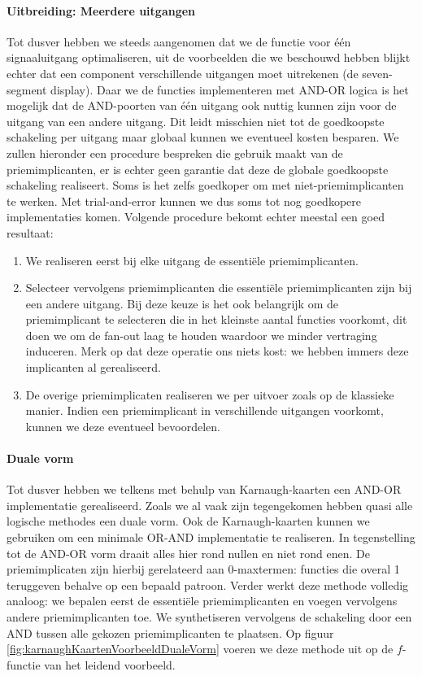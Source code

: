 \paragraph{Uitbreiding: Meerdere uitgangen}
Tot dusver hebben we steeds aangenomen dat we de functie voor \'e\'en signaaluitgang optimaliseren, uit de voorbeelden die we beschouwd hebben blijkt echter dat een component verschillende uitgangen moet uitrekenen (de seven-segment display). Daar we de functies implementeren met AND-OR logica is het mogelijk dat de AND-poorten van \'e\'en uitgang ook nuttig kunnen zijn voor de uitgang van een andere uitgang. Dit leidt misschien niet tot de goedkoopste schakeling per uitgang maar globaal kunnen we eventueel kosten besparen. We zullen hieronder een procedure bespreken die gebruik maakt van de priemimplicanten, er is echter geen garantie dat deze de globale goedkoopste schakeling realiseert. Soms is het zelfs goedkoper om met niet-priemimplicanten te werken. Met trial-and-error kunnen we dus soms tot nog goedkopere implementaties komen. Volgende procedure bekomt echter meestal een goed resultaat:
\begin{enumerate}
 \item We realiseren eerst bij elke uitgang de essenti\"ele priemimplicanten.
 \item Selecteer vervolgens priemimplicanten die essenti\"ele priemimplicanten zijn bij een andere uitgang. Bij deze keuze is het ook belangrijk om de priemimplicant te selecteren die in het kleinste aantal functies voorkomt, dit doen we om de fan-out laag te houden waardoor we minder vertraging induceren. Merk op dat deze operatie ons niets kost: we hebben immers deze implicanten al gerealiseerd.
 \item De overige priemimplicaten realiseren we per uitvoer zoals op de klassieke manier. Indien een priemimplicant in verschillende uitgangen voorkomt, kunnen we deze eventueel bevoordelen.
\end{enumerate}
\paragraph{Duale vorm}
Tot dusver hebben we telkens met behulp van Karnaugh-kaarten een AND-OR implementatie gerealiseerd. Zoals we al vaak zijn tegengekomen hebben quasi alle logische methodes een duale vorm. Ook de Karnaugh-kaarten kunnen we gebruiken om een minimale OR-AND implementatie te realiseren. In tegenstelling tot de AND-OR vorm draait alles hier rond nullen en niet rond enen. De priemimplicaten zijn hierbij gerelateerd aan 0-maxtermen: functies die overal 1 teruggeven behalve op een bepaald patroon. Verder werkt deze methode volledig analoog: we bepalen eerst de essenti\"ele priemimplicanten en voegen vervolgens andere priemimplicanten toe. We synthetiseren vervolgens de schakeling door een AND tussen alle gekozen priemimplicanten te plaatsen. Op figuur \ref{fig:karnaughKaartenVoorbeeldDualeVorm} voeren we deze methode uit op de $f$-functie van het leidend voorbeeld.
